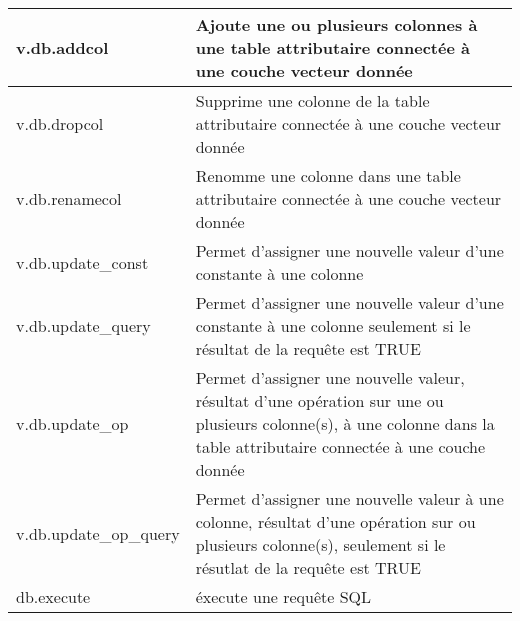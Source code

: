 \begin{table}[H]
\begin{tabular}{|p{4cm}|p{10cm}|}
  \hline v.db.addcol & Ajoute une ou plusieurs colonnes à une table attributaire connectée à une couche vecteur donnée\\
  \hline v.db.dropcol & Supprime une colonne de la table attributaire connectée à une couche vecteur donnée\\
  \hline v.db.renamecol & Renomme une colonne dans une table attributaire connectée à une couche vecteur donnée\\
  \hline v.db.update\_const & Permet d'assigner une nouvelle valeur d'une constante à une colonne\\
  \hline v.db.update\_query & Permet d'assigner une nouvelle valeur d'une constante à une colonne seulement si le résultat de la requ\^ete est TRUE\\
  \hline v.db.update\_op & Permet d'assigner une nouvelle valeur, résultat d'une opération sur une ou plusieurs colonne(s), à une colonne dans la table attributaire connectée à une couche donnée\\
  \hline v.db.update\_op\_query & Permet d'assigner une nouvelle valeur à une colonne, résultat d'une opération sur ou plusieurs colonne(s), seulement si le résutlat de la requ\^ete est TRUE \\
  \hline db.execute & éxecute une requ\^ete SQL\\

\end{tabular}
\end{table}
